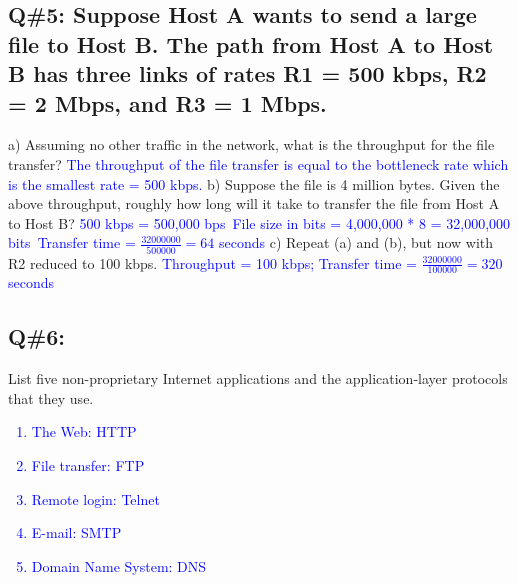 \subsection*{Q\#5: Suppose Host A wants to send a large file to Host B. The path from Host A to Host B has three links of rates R1 = 500 kbps, R2 = 2 Mbps, and R3 = 1 Mbps.}
a) Assuming no other traffic in the network, what is the throughput for the file transfer?
\newline
\textcolor{blue}{
The throughput of the file transfer is equal to the bottleneck rate which is the smallest rate = 500 kbps.
}
\newline
b) Suppose the file is 4 million bytes. Given the above throughput, roughly how long will it take to transfer the file from Host A to Host B?
\newline
\textcolor{blue}{
500 kbps = 500,000 bps\
File size in bits = 4,000,000 * 8 = 32,000,000 bits\
Transfer time = $\frac{32000000}{500000} = 64$ seconds
}
\newline
c) Repeat (a) and (b), but now with R2 reduced to 100 kbps.
\newline
\textcolor{blue}{
Throughput = 100 kbps; Transfer time = $\frac{32000000}{100000} = 320$ seconds
}
\subsection*{Q\#6:}

List five non-proprietary Internet applications and the application-layer protocols that they use.
\textcolor{blue}{
\begin{enumerate}
    \item The Web: HTTP
    \item File transfer: FTP
    \item Remote login: Telnet
    \item E-mail: SMTP
    \item Domain Name System: DNS
\end{enumerate}
}
